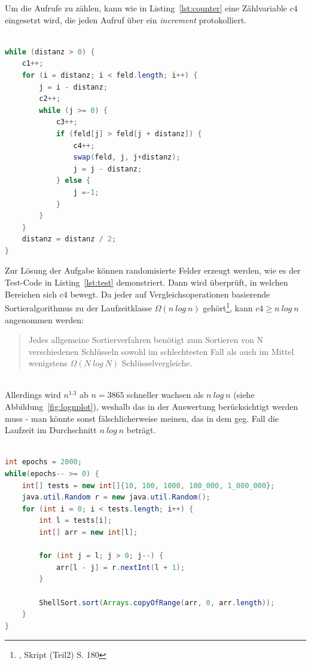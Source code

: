 Um die Aufrufe zu zählen, kann wie in Listing~\ref{lst:counter} eine Zählvariable $c4$ eingesetzt wird, die jeden Aufruf über ein \textit{increment} protokolliert.

\begin{lstlisting}[language=java,caption={Zur Protokollierung der Aufrufe können in dem Code Zählvariablen eingesetzt werden ($c1, .. ,c4$).},label=lst:counter]

while (distanz > 0) {
    c1++;
    for (i = distanz; i < feld.length; i++) {
        j = i - distanz;
        c2++;
        while (j >= 0) {
            c3++;
            if (feld[j] > feld[j + distanz]) {
                c4++;
                swap(feld, j, j+distanz);
                j = j - distanz;
            } else {
                j =-1;
            }
        }
    }
    distanz = distanz / 2;
}

\end{lstlisting}

Zur Lösung der Aufgabe können randomisierte Felder erzeugt werden, wie es der Test-Code in Listing~\ref{lst:test} demonstriert. Dann wird überprüft, in welchen Bereichen sich $c4$ bewegt.
Da jeder auf Vergleichsoperationen basierende Sortieralgorithmus zu der Laufzeitklasse $\Omega(n\ log\ n)$ gehört\footnote{\cite[154]{OW17b}, Skript (Teil2) S. 180}, kann $c4 \geq n\ log\ n$ angenommen werden:

\blockquote[{\cite[154, Satz 2.4]{OW17b}}]{
Jedes allgemeine Sortierverfahren benötigt zum Sortieren von N verschiedenen Schlüsseln sowohl im schlechtesten Fall als auch im Mittel wenigstens $\Omega(N\ log\ N)$
Schlüsselvergleiche.
}\\

Allerdings wird $n^{1.3}$ ab $n=3865$ schneller wachsen als $n\ log\ n$ (siehe Abbildung~\ref{fig:lognplot}), weshalb das in der Auswertung berücksichtigt werden muss - man könnte sonst fälschlicherweise meinen, das in dem geg. Fall die Laufzeit im Durchschnitt $n\ log\ n$ beträgt.

\begin{lstlisting}[language=java,caption={Code zum Erzeugen randomisierter Felder zum Testen von Shellsort.},label=lst:test]

int epochs = 2000;
while(epochs-- >= 0) {
    int[] tests = new int[]{10, 100, 1000, 100_000, 1_000_000};
    java.util.Random r = new java.util.Random();
    for (int i = 0; i < tests.length; i++) {
        int l = tests[i];
        int[] arr = new int[l];

        for (int j = l; j > 0; j--) {
            arr[l - j] = r.nextInt(l + 1);
        }

        ShellSort.sort(Arrays.copyOfRange(arr, 0, arr.length));
    }
}
\end{lstlisting}


